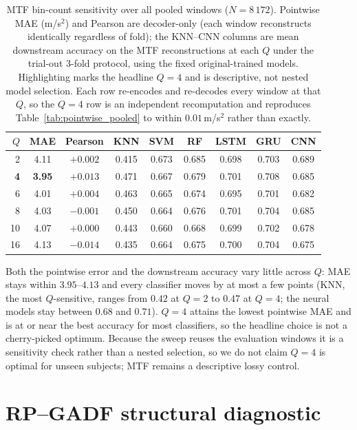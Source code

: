 \documentclass[10pt,a4paper,parskip=half-]{scrartcl}
\begin{document}
\begin{table}[!htbp]
\centering
\caption{MTF bin-count sensitivity over all pooled windows ($N=8\,172$). Pointwise MAE (m/s$^2$) and Pearson are decoder-only (each window reconstructs identically regardless of fold); the KNN--CNN columns are mean downstream accuracy on the MTF reconstructions at each $Q$ under the trial-out 3-fold protocol, using the fixed original-trained models. Highlighting marks the headline $Q=4$ and is descriptive, not nested model selection. Each row re-encodes and re-decodes every window at that $Q$, so the $Q=4$ row is an independent recomputation and reproduces Table~\ref{tab:pointwise_pooled} to within $0.01$\,m/s$^2$ rather than exactly.}
\label{tab:mtf_ablation_q}
\setlength{\tabcolsep}{6pt}
\small
\begin{tabular}{rcc|cccccc}
\toprule
$Q$ & MAE & Pearson & KNN & SVM & RF & LSTM & GRU & CNN \\
\midrule
2  & 4.11 & $+0.002$ & 0.415 & 0.673 & 0.685 & 0.698 & 0.703 & 0.689 \\
\textbf{4}  & \textbf{3.95} & $\mathbf{+0.013}$ & 0.471 & 0.667 & 0.679 & 0.701 & 0.708 & 0.685 \\
6  & 4.01 & $+0.004$ & 0.463 & 0.665 & 0.674 & 0.695 & 0.701 & 0.682 \\
8  & 4.03 & $-0.001$ & 0.450 & 0.664 & 0.676 & 0.701 & 0.704 & 0.685 \\
10 & 4.07 & $+0.000$ & 0.443 & 0.660 & 0.668 & 0.699 & 0.702 & 0.678 \\
16 & 4.13 & $-0.014$ & 0.435 & 0.664 & 0.675 & 0.700 & 0.704 & 0.675 \\
\bottomrule
\end{tabular}
\end{table}

Both the pointwise error and the downstream accuracy vary little across $Q$: MAE stays within $3.95$--$4.13$ and every classifier moves by at most a few points (KNN, the most $Q$-sensitive, ranges from $0.42$ at $Q=2$ to $0.47$ at $Q=4$; the neural models stay between $0.68$ and $0.71$). $Q=4$ attains the lowest pointwise MAE and is at or near the best accuracy for most classifiers, so the headline choice is not a cherry-picked optimum. Because the sweep reuses the evaluation windows it is a sensitivity check rather than a nested selection, so we do not claim $Q=4$ is optimal for unseen subjects; MTF remains a descriptive lossy control.

\section{RP--GADF structural diagnostic}
\end{document}
